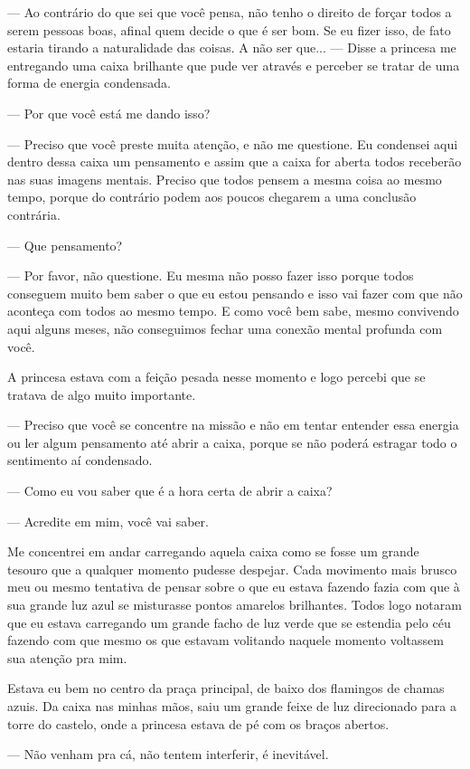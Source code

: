 — Ao contrário do que sei que você pensa, não tenho o direito de forçar todos a serem pessoas boas, afinal quem decide o que é ser bom. Se eu fizer isso, de fato estaria tirando a naturalidade das coisas. A não ser que... — Disse a princesa me entregando uma caixa brilhante que pude ver através e perceber se tratar de uma forma de energia condensada.

— Por que você está me dando isso?

— Preciso que você preste muita atenção, e não me questione. Eu condensei aqui dentro dessa caixa um pensamento e assim que a caixa for aberta todos receberão nas suas imagens mentais. Preciso que todos pensem a mesma coisa ao mesmo tempo, porque do contrário podem aos poucos chegarem a uma conclusão contrária.

— Que pensamento?

— Por favor, não questione. Eu mesma não posso fazer isso porque todos conseguem muito bem saber o que eu estou pensando e isso vai fazer com que não aconteça com todos ao mesmo tempo. E como você bem sabe, mesmo convivendo aqui alguns meses, não conseguimos fechar uma conexão mental profunda com você.

A princesa estava com a feição pesada nesse momento e logo percebi que se tratava de algo muito importante.

— Preciso que você se concentre na missão e não em tentar entender essa energia ou ler algum pensamento até abrir a caixa, porque se não poderá estragar todo o sentimento aí condensado.

— Como eu vou saber que é a hora certa de abrir a caixa?

— Acredite em mim, você vai saber.

Me concentrei em andar carregando aquela caixa como se fosse um grande tesouro que a qualquer momento pudesse despejar. Cada movimento mais brusco meu ou mesmo tentativa de pensar sobre o que eu estava fazendo fazia com que à sua grande luz azul se misturasse pontos amarelos brilhantes. Todos logo notaram que eu estava carregando um grande facho de luz verde que se estendia pelo céu fazendo com que mesmo os que estavam volitando naquele momento voltassem sua atenção pra mim.

Estava eu bem no centro da praça principal, de baixo dos flamingos de chamas azuis. Da caixa nas minhas mãos, saiu um grande feixe de luz direcionado para a torre do castelo, onde a princesa estava de pé com os braços abertos.

— Não venham pra cá, não tentem interferir, é inevitável.

